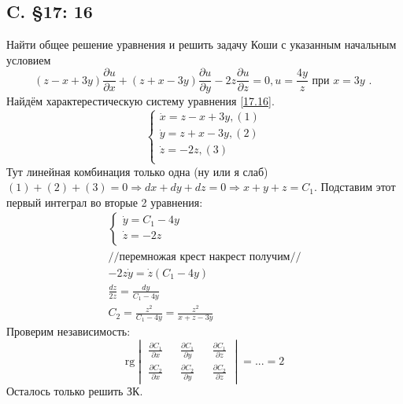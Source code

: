 \documentclass{article}
\newcommand{\rg}{\text{rg}}
\begin{document}
\subsection{C. \S17: 16}
Найти общее решение уравнения и решить задачу Коши с указанным
начальным условием
\begin{equation}\label{17.16}
(z-x+3 y) \frac{\partial u}{\partial x}+(z+x-3 y) \frac{\partial u}{\partial y}-2 z \frac{\partial u}{\partial z}=0, u=\frac{4 y}{z} \text { при } x=3 y \text { . }
\end{equation}
Найдём характерестическую систему уравнения \ref{17.16}.
\begin{equation*}
    \begin{cases}
        \dot x = z-x+3y, (1)\\
        \dot y = z+x-3y, (2)\\
        \dot z = -2z,(3)\\
    \end{cases}
\end{equation*}
Тут линейная комбинация только одна (ну или я слаб) $(1) + (2) + (3)=0 \Rightarrow dx+dy+dz=0 \Rightarrow x+y+z = C_1$. Подставим этот первый интеграл во вторые 2 уравнения:
\begin{gather*}
    \begin{cases}
        \dot y = C_1-4y\\
        \dot z =-2z\\
    \end{cases}\\
//\text{перемножая крест накрест получим}//\\
-2z \dot y = \dot z(C_1-4y)\\
\frac{dz}{2z}=\frac{dy}{C_1-4y}\\
C_2=\frac{z^2}{C_1-4y}= \frac{z^2}{x+z-3y}
\end{gather*}
Проверим независимость: 
\begin{equation*}
    \rg \begin{vmatrix}
        \frac{\partial C_1}{\partial x} && \frac{\partial C_1}{\partial y} && \frac{\partial C_1}{\partial z}\\
        \frac{\partial C_2}{\partial x} && \frac{\partial C_2}{\partial y} && \frac{\partial C_2}{\partial z}
    \end{vmatrix} = ... = 2
\end{equation*}
Осталось только решить ЗК.
\end{document}

